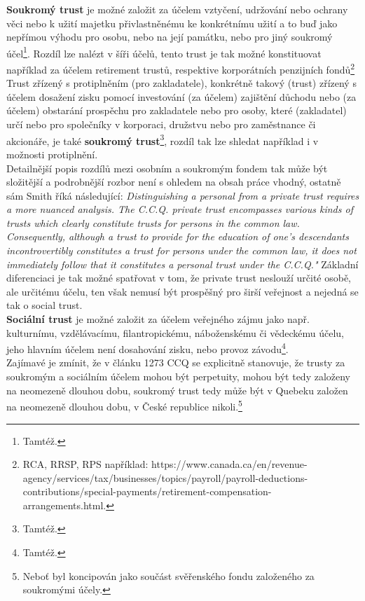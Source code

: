\documentclass{article}
\begin{document}
\textbf{Soukromý trust} je možné založit za účelem vztyčení, udržování nebo ochrany věci nebo k užití majetku přivlastněnému ke konkrétnímu užití a to buď jako nepřímou výhodu pro osobu, nebo na její památku, nebo pro jiný soukromý účel\footnote{Tamtéž.}. Rozdíl lze nalézt v šíři účelů, tento trust je tak možné konstituovat například za účelem retirement trustů, respektive korporátních penzijních fondů\footnote{RCA, RRSP, RPS například: https://www.canada.ca/en/revenue-agency/services/tax/businesses/topics/payroll/payroll-deductions-contributions/special-payments/retirement-compensation-arrangements.html.}\\

Trust zřízený s protiplněním (pro zakladatele), konkrétně takový (trust) zřízený s účelem dosažení zisku pomocí investování (za účelem) zajištění důchodu nebo (za účelem) obstarání prospěchu pro zakladatele nebo pro osoby, které (zakladatel) určí nebo pro společníky v korporaci, družstvu nebo pro zaměstnance či akcionáře, je také \textbf{soukromý trust}\footnote{Tamtéž.}, rozdíl tak lze shledat například i v možnosti protiplnění.\\

Detailnější popis rozdílů mezi osobním a soukromým fondem tak může být složitější a podrobnější rozbor není s ohledem na obsah práce vhodný, ostatně sám Smith říká následující: \textit{Distinguishing a personal from a private trust requires a more nuanced analysis. The C.C.Q. private trust encompasses various kinds of trusts which clearly constitute trusts for persons in the common law. Consequently, although  a trust to provide for the education of one's descendants incontrovertibly constitutes a trust for persons under the common law, it does not immediately follow that it constitutes a personal trust under the C.C.Q."} Základní diferenciaci je tak možné spatřovat v tom, že private trust neslouží určité osobě, ale určitému účelu, ten však nemusí být prospěšný pro širší veřejnost a nejedná se tak o social trust.\\

\textbf{Sociální trust} je možné založit za účelem veřejného zájmu jako např. kulturnímu, vzdělávacímu, filantropickému, náboženskému či vědeckému účelu, jeho hlavním účelem není dosahování zisku, nebo provoz závodu\footnote{Tamtéž.}.\\

Zajímavé je zmínit, že v článku 1273 CCQ se explicitně stanovuje, že trusty za soukromým a sociálním účelem mohou být perpetuity, mohou být tedy založeny na neomezeně dlouhou dobu, soukromý trust tedy může být v Quebeku založen na neomezeně dlouhou dobu, v České republice nikoli.\footnote{Neboť byl koncipován jako součást svěřenského fondu založeného za soukromými účely.}\\
\end{document}
